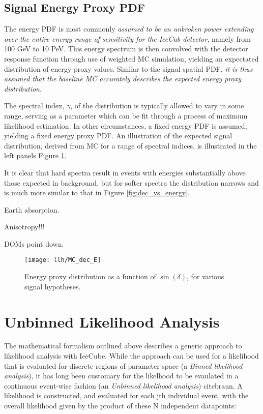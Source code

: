 \subsection{Signal Energy Proxy PDF}

The energy PDF is most commonly \emph{assumed to be an unbroken power extending over the entire energy range of sensitivity for the IceCub detector}, namely from 100 GeV to 10 PeV. This energy spectrum is then convolved with the detector response function through use of weighted MC simulation, yielding an expectated distribution of energy proxy values. Similar to the signal spatial PDF, \emph{it is thus assumed that the baseline MC accurately describes the expected energy proxy distribution}. 

The spectral index, $\gamma$, of the distribution is typically allowed to vary in some range, serving as a parameter which can be fit through a process of maximum likelihood estimation. In other circumstances, a fixed energy PDF is assumed, yielding a fixed energy proxy PDF. An illustration of the expected signal distribution, derived from MC for a range of spectral indices, is illustrated in the left panels Figure \ref{fig:mc_dec_e}.

It is clear that hard spectra result in events with energies substantially above those expected in background, but for softer spectra the distribution narrows and is much more similar to that in Figure \ref{fig:dec_vs_energy}. 

Earth absorption.

Anisotropy!!!

DOMs point down.

\begin{figure}[!ht]
	\centering \texttt{[image: llh/MC\_dec\_E]}
	\caption{Energy proxy distribution as a function of $\sin(\delta)$, for various signal hypotheses.}
	\label{fig:mc_dec_e}
\end{figure}

\section{Unbinned Likelihood Analysis}
The mathematical formalism outlined above describes a generic approach to likelihood analysis with IceCube. While the approach can be used for a likelihood that is evaluated for discrete regions of parameter space (a \emph{Binned likelihood analysis}), it has long been customary for the likelhood to be evaulated in a continuous event-wise fashion (an \emph{Unbinned likelihood analysis}) citebraun. A likelihood is constructed, and evaluated for each jth individual event, with the overall likelihood given by the product of these N independent datapoints:

